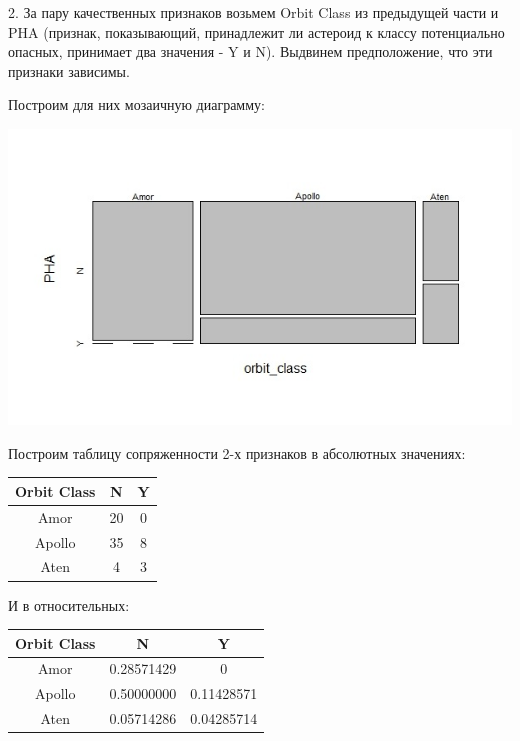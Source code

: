 \documentclass{article}
\begin{document}
\vspace{.2cm}

2. За пару качественных признаков возьмем Orbit Class из предыдущей части и PHA (признак, показывающий, принадлежит ли астероид к классу потенциально опасных, принимает два значения - Y и N). Выдвинем предположение, что эти признаки зависимы.

Построим для них мозаичную диаграмму:

\includegraphics[scale = 0.7]{img/Rplot-2.jpeg}

Построим таблицу сопряженности 2-х признаков в абсолютных значениях:

\begin{center}
	\begin{tabular}{|c|c|c|}
		\hline
		Orbit Class & N & Y \\
		\hline
		Amor & 20 & 0 \\
		\hline
		Apollo & 35 & 8 \\
		\hline
		Aten & 4 & 3 \\
		\hline
	\end{tabular}
\end{center}

И в относительных:

\begin{center}
	\begin{tabular}{|c|c|c|}
		\hline
		Orbit Class & N & Y \\
		\hline
		Amor & 0.28571429 & 0 \\
		\hline
		Apollo & 0.50000000 & 0.11428571 \\
		\hline
		Aten & 0.05714286 & 0.04285714 \\
		\hline
	\end{tabular}
\end{center}
\end{document}
